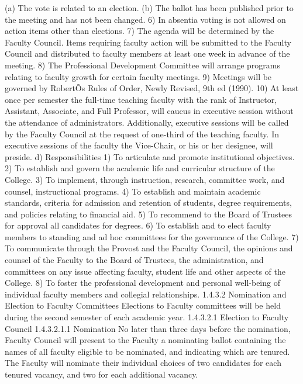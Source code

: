 \documentclass[letterpaper, 11pt]{article}
\begin{document}
			(a) The vote is related to an election.
			(b) The ballot has been published prior to the meeting and has not been changed.
			6) In absentia voting is not allowed on action items other than elections.
			7) The agenda will be determined by the Faculty Council.  Items requiring faculty action will be submitted to the Faculty Council and distributed to faculty members at least one week in advance of the meeting.
			8) The Professional Development Committee will arrange programs relating to faculty growth for certain faculty meetings.
			9) Meetings will be governed by RobertÕs Rules of Order, Newly Revised, 9th ed (1990).
			10) At least once per semester the full-time teaching faculty with the rank of Instructor, Assistant, Associate, and Full Professor, will caucus in executive session without the attendance of administrators.  Additionally, executive sessions will be called by the Faculty Council at the request of one-third of the teaching faculty.  In executive sessions of the faculty the Vice-Chair, or his or her designee, will preside.
			d) Responsibilities
			1) To articulate and promote institutional objectives.
			2) To establish and govern the academic life and curricular structure of the College.
			3) To implement, through instruction, research, committee work, and counsel, instructional programs.
			4) To establish and maintain academic standards, criteria for admission and retention of students, degree requirements, and policies relating to financial aid.
			5) To recommend to the Board of Trustees for approval all candidates for degrees.
			6) To establish and to elect faculty members to standing and ad hoc committees for the governance of the College.
			7) To communicate through the Provost and the Faculty Council, the opinions and counsel of the Faculty to the Board of Trustees, the administration, and committees on any issue affecting faculty, student life and other aspects of the College.
			8) To foster the professional development and personal well-being of individual faculty members and collegial relationships.
			1.4.3.2 	Nomination and Election to Faculty Committees
			Elections to Faculty committees will be held during the second semester of each academic year.
			1.4.3.2.1 Election to Faculty Council
			1.4.3.2.1.1 Nomination
			No later than three days before the nomination, Faculty Council will present to the Faculty a nominating ballot containing the names of all faculty eligible to be nominated, and indicating which are tenured.  The Faculty will nominate their individual choices of two candidates for each tenured vacancy, and two for each additional vacancy.
\end{document}
